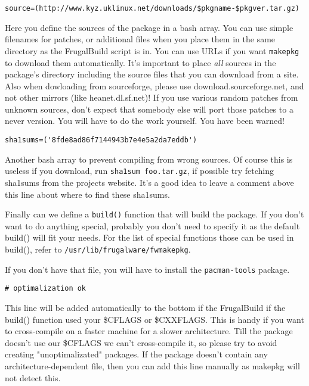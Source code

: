 \begin{verbatim}
source=(http://www.kyz.uklinux.net/downloads/$pkgname-$pkgver.tar.gz)
\end{verbatim}

Here you define the sources of the package in a bash array. You can use simple
filenames for patches, or additional files when you place them in the same
directory as the FrugalBuild script is in. You can use URLs if you want
{\tt makepkg} to download them automatically. It's important to place
\textit{all} sources in the package's directory including the source files
that you can download from a site.
Also when dowloading from sourceforge, please use download.sourceforge.net, and
not other mirrors (like heanet.dl.sf.net)!
If you use various random patches from unknown sources, don't expect that
somebody else will port those patches to a never version. You will have to do
the work yourself. You have been warned!

\begin{verbatim}
sha1sums=('8fde8ad86f7144943b7e4e5a2da7eddb')
\end{verbatim}

Another bash array to prevent compiling from wrong sources. Of course this is
useless if you download, run {\tt sha1sum foo.tar.gz}, if possible try fetching
sha1sums from the projects website. It's a good idea to leave a comment above
this line about where to find these sha1sums.

Finally can we define a {\tt build()} function that will build the package.
If you don't want to do anything special, probably you don't need to specify it
as the default build() will fit your needs. For the list of special functions
those can be used in build(), refer to {\tt /usr/lib/frugalware/fwmakepkg}.

If you don't have that file, you will have to install the {\tt pacman-tools}
package.

\begin{verbatim}
# optimalization ok
\end{verbatim}

This line will be added automatically to the bottom if the FrugalBuild if the
build() function used your \$CFLAGS or \$CXXFLAGS. This is handy if you want to
cross-compile on a faster machine for a slower architecture. Till the package
doesn't use our \$CFLAGS we can't cross-compile it, so please try to avoid
creating "unoptimalizated" packages. If the package doesn't contain any
architecture-dependent file, then you can add this line manually as makepkg
will not detect this.

